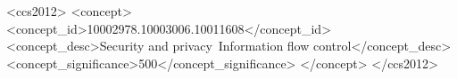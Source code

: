 \documentclass[sigconf, authorversion]{acmart}
\begin{document}
%
%
 \begin{CCSXML}
<ccs2012>
<concept>
<concept_id>10002978.10003006.10011608</concept_id>
<concept_desc>Security and privacy~Information flow control</concept_desc>
<concept_significance>500</concept_significance>
</concept>
</ccs2012>
\end{CCSXML}

%
%


\keywords{}



\maketitle









\end{document}

